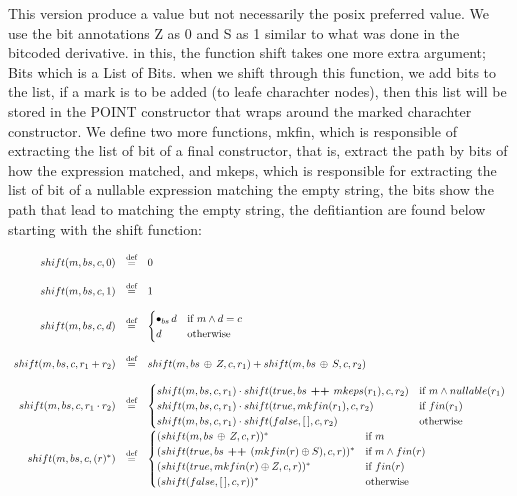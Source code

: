 \documentclass[12pt]{article}
\begin{document}
This version produce a value but not necessarily the posix preferred value. We use the bit annotations 
Z as 0 and S as 1 similar to what was done in the bitcoded derivative.
in this, the function shift takes one more extra argument; Bits which is a List of Bits. 
when we shift through this function, we add bits to the list, if a mark is to be added (to leafe charachter nodes),
then this list will be stored in the POINT constructor that wraps around the marked charachter constructor. We 
define two more functions, mkfin, which is responsible of extracting the list of bit of a final constructor, that
is, extract the path by bits of how the expression matched, and mkeps, which is responsible for extracting the list
of bit of a nullable expression matching the empty string, the bits show the path that lead to matching the empty string,
the defitiantion are found below starting with the shift function:

\[
\begin{array}{rcl}
  shift(m,bs,c,0)              & \stackrel{\text{def}}{=} & 0 \\\\
  shift(m,bs,c,1)              & \stackrel{\text{def}}{=} & 1 \\\\
  shift(m,bs,c,d)              & \stackrel{\text{def}}{=} & 
   \begin{cases}
    \bullet_{bs} \, d & \text{if  $ m \land d = c $}\\
    d                 & \text{otherwise}
   \end{cases} \\\\

  shift(m,bs,c, r_1 + r_2)     & \stackrel{\text{def}}{=} & shift(m,bs \, \oplus \, Z,c,r_1) + shift(m,bs \, \oplus \, S,c,r_2) \\\\
  
  shift(m,bs,c, r_1 \cdot r_2) & \stackrel{\text{def}}{=} &
  \begin{cases}
      shift(m,bs,c,r_1)  \cdot shift(true,bs \textbf{ ++ } mkeps(r_1),c,r_2) & \text{if $ m \land nullable(r_1) $}\\
      shift(m,bs,c,r_1)  \cdot shift(true,mkfin(r_1),c,r_2)                  & \text{if $ fin(r_1) $}\\
      shift(m,bs,c,r_1)  \cdot shift(false,[\,],c,r_2)                       & \text{otherwise} 
    \end{cases}  \\

  shift(m,bs,c,(r)^*)          & \stackrel{\text{def}}{=} &
    \begin{cases}
      (shift(m,bs \, \oplus \, Z,c,r))^*                & \text{if $ m $} \\
      (shift(true,bs \textbf{ ++ } (mkfin(r) \oplus S),c,r))^* & \text{if \( m \land fin(r) \)} \\
      (shift(true,mkfin(r) \oplus Z,c,r))^* & \text{if \( fin(r) \)} \\
      (shift(false,[\,],c,r))^*           & \text{otherwise}
    \end{cases}
\end{array}
\]
\end{document}
